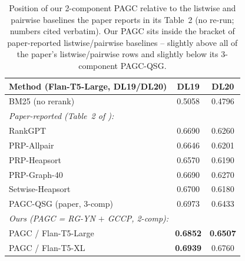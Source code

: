 \documentclass[sigconf]{acmart}
\begin{document}
\begin{table}[t]
\centering
\small
\begin{tabular}{lcc}
\toprule
\textbf{Method (Flan-T5-Large, DL19/DL20)} & DL19 & DL20 \\
\midrule
BM25 (no rerank)                       & 0.5058 & 0.4796 \\
\midrule
\multicolumn{3}{l}{\emph{Paper-reported (Table~2 of \cite{long2025precise}):}}\\
\quad RankGPT                          & 0.6690 & 0.6260 \\
\quad PRP-Allpair                      & 0.6646 & 0.6201 \\
\quad PRP-Heapsort                     & 0.6570 & 0.6190 \\
\quad PRP-Graph-40                     & 0.6690 & 0.6270 \\
\quad Setwise-Heapsort                 & 0.6700 & 0.6180 \\
\quad PAGC-QSG (paper, 3-comp)         & 0.6973 & 0.6433 \\
\midrule
\multicolumn{3}{l}{\emph{Ours (PAGC = RG-YN $+$ GCCP, 2-comp):}}\\
\quad PAGC / Flan-T5-Large             & \textbf{0.6852} & \textbf{0.6507} \\
\quad PAGC / Flan-T5-XL                & \textbf{0.6939} & 0.6760 \\
\bottomrule
\end{tabular}
\caption{Position of our 2-component PAGC relative to the listwise
and pairwise baselines the paper reports in its Table~2 (no
re-run; numbers cited verbatim). Our PAGC sits inside the bracket
of paper-reported listwise/pairwise baselines -- slightly above
all of the paper's listwise/pairwise rows and slightly below its
3-component PAGC-QSG.}
\label{tab:rankgpt}
\end{table}
\end{document}
